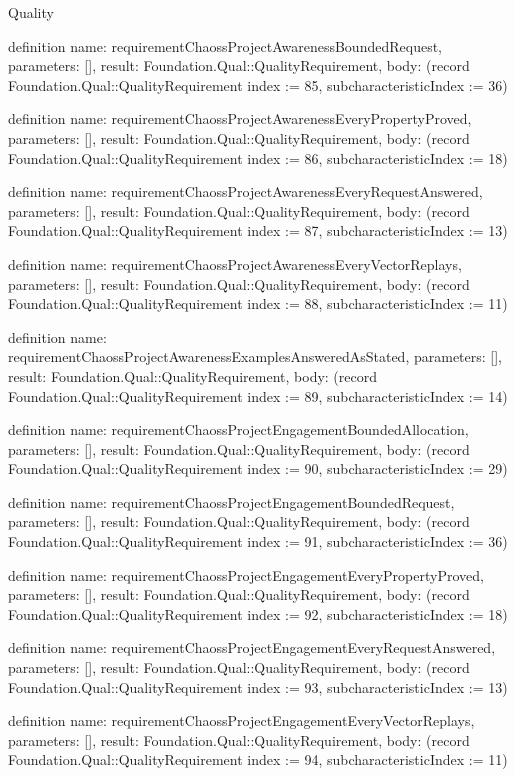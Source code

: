 \begin{lexlean}{Quality}
\begin{semanticmodule}
definition{
  name: requirementChaossProjectAwarenessBoundedRequest,
  parameters: [],
  result: Foundation.Qual::QualityRequirement,
  body: (record Foundation.Qual::QualityRequirement {index := 85, subcharacteristicIndex := 36})
}

definition{
  name: requirementChaossProjectAwarenessEveryPropertyProved,
  parameters: [],
  result: Foundation.Qual::QualityRequirement,
  body: (record Foundation.Qual::QualityRequirement {index := 86, subcharacteristicIndex := 18})
}

definition{
  name: requirementChaossProjectAwarenessEveryRequestAnswered,
  parameters: [],
  result: Foundation.Qual::QualityRequirement,
  body: (record Foundation.Qual::QualityRequirement {index := 87, subcharacteristicIndex := 13})
}

definition{
  name: requirementChaossProjectAwarenessEveryVectorReplays,
  parameters: [],
  result: Foundation.Qual::QualityRequirement,
  body: (record Foundation.Qual::QualityRequirement {index := 88, subcharacteristicIndex := 11})
}

definition{
  name: requirementChaossProjectAwarenessExamplesAnsweredAsStated,
  parameters: [],
  result: Foundation.Qual::QualityRequirement,
  body: (record Foundation.Qual::QualityRequirement {index := 89, subcharacteristicIndex := 14})
}

definition{
  name: requirementChaossProjectEngagementBoundedAllocation,
  parameters: [],
  result: Foundation.Qual::QualityRequirement,
  body: (record Foundation.Qual::QualityRequirement {index := 90, subcharacteristicIndex := 29})
}

definition{
  name: requirementChaossProjectEngagementBoundedRequest,
  parameters: [],
  result: Foundation.Qual::QualityRequirement,
  body: (record Foundation.Qual::QualityRequirement {index := 91, subcharacteristicIndex := 36})
}

definition{
  name: requirementChaossProjectEngagementEveryPropertyProved,
  parameters: [],
  result: Foundation.Qual::QualityRequirement,
  body: (record Foundation.Qual::QualityRequirement {index := 92, subcharacteristicIndex := 18})
}

definition{
  name: requirementChaossProjectEngagementEveryRequestAnswered,
  parameters: [],
  result: Foundation.Qual::QualityRequirement,
  body: (record Foundation.Qual::QualityRequirement {index := 93, subcharacteristicIndex := 13})
}

definition{
  name: requirementChaossProjectEngagementEveryVectorReplays,
  parameters: [],
  result: Foundation.Qual::QualityRequirement,
  body: (record Foundation.Qual::QualityRequirement {index := 94, subcharacteristicIndex := 11})
}


\end{semanticmodule}
\end{lexlean}
